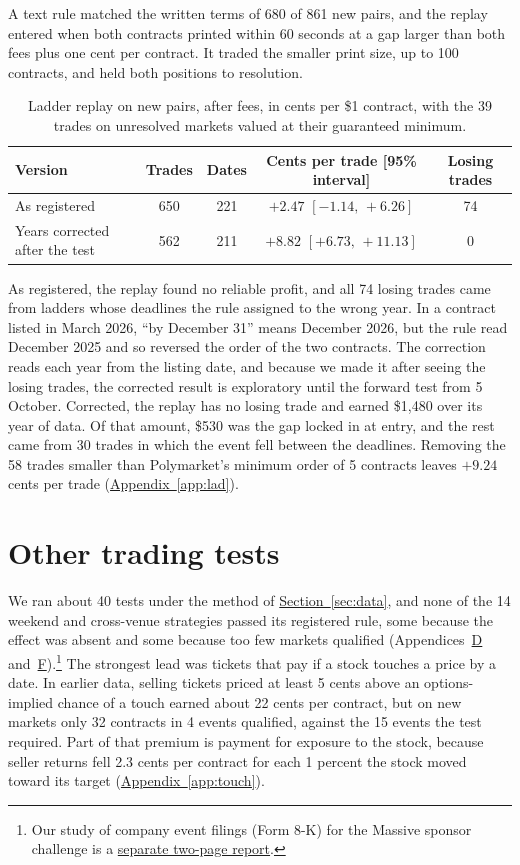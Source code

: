 \documentclass[11pt]{article}
\newcommand{\ci}[2]{\ensuremath{[#1,\,#2]}}
\newcommand{\lref}[2]{\hyperref[#2]{#1~\ref*{#2}}}
\begin{document}
A text rule matched the written terms of 680 of 861 new pairs, and the replay entered when both contracts printed within 60 seconds at a gap larger than both fees plus one cent per contract. It traded the smaller print size, up to 100 contracts, and held both positions to resolution.

\begin{table}[H]
\centering
\caption{Ladder replay on new pairs, after fees, in cents per \$1 contract, with the 39 trades on unresolved markets valued at their guaranteed minimum.}
\label{tab:lad}
\begin{tabular}{lcccc}
\toprule
Version & Trades & Dates & Cents per trade [95\% interval] & Losing trades \\
\midrule
As registered & 650 & 221 & $+2.47$ \ci{-1.14}{+6.26} & 74 \\
Years corrected after the test & 562 & 211 & $+8.82$ \ci{+6.73}{+11.13} & 0 \\
\bottomrule
\end{tabular}
\end{table}

As registered, the replay found no reliable profit, and all 74 losing trades came from ladders whose deadlines the rule assigned to the wrong year. In a contract listed in March 2026, ``by December 31'' means December 2026, but the rule read December 2025 and so reversed the order of the two contracts. The correction reads each year from the listing date, and because we made it after seeing the losing trades, the corrected result is exploratory until the forward test from 5 October. Corrected, the replay has no losing trade and earned \$1,480 over its year of data. Of that amount, \$530 was the gap locked in at entry, and the rest came from 30 trades in which the event fell between the deadlines. Removing the 58 trades smaller than Polymarket's minimum order of 5 contracts leaves $+9.24$ cents per trade (\lref{Appendix}{app:lad}).

\section{Other trading tests}\label{sec:fail}
We ran about 40 tests under the method of \lref{Section}{sec:data}, and none of the 14 weekend and cross-venue strategies passed its registered rule, some because the effect was absent and some because too few markets qualified (Appendices~\hyperref[app:fail]{D} and~\hyperref[app:all]{F}).\footnote{Our study of company event filings (Form 8-K) for the Massive sponsor challenge is a \href{https://github.com/theomachado05/polybridge/blob/main/note/WRITEUP.md}{separate two-page report}.} The strongest lead was tickets that pay if a stock touches a price by a date. In earlier data, selling tickets priced at least 5 cents above an options-implied chance of a touch earned about 22 cents per contract, but on new markets only 32 contracts in 4 events qualified, against the 15 events the test required. Part of that premium is payment for exposure to the stock, because seller returns fell 2.3 cents per contract for each 1 percent the stock moved toward its target (\lref{Appendix}{app:touch}).
\end{document}
